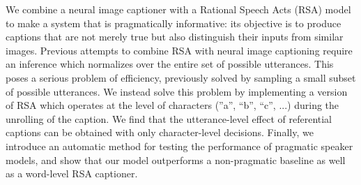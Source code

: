 We combine a neural image captioner with a Rational Speech Acts (RSA) model to make a system that is pragmatically informative: its objective is to produce captions that are not merely true but also distinguish their inputs from similar images. Previous attempts to combine RSA with neural image captioning require an inference which normalizes over the entire set of possible utterances. This poses a serious problem of efficiency, previously solved by sampling a small subset of possible utterances. We instead solve this problem by implementing a version of RSA which operates at the level of characters (''a'', ``b'', ``c'', ...) during the unrolling of the caption. We find that the utterance-level effect of referential captions can be obtained with only character-level decisions. Finally, we introduce an automatic method for testing the performance of pragmatic speaker models, and show that our model outperforms a non-pragmatic baseline as well as a word-level RSA captioner.
